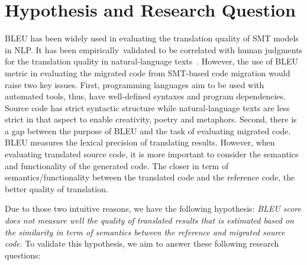 \section{Hypothesis and Research Question}

BLEU has been widely used in evaluating the translation quality of SMT
models in NLP. It has been empirically~validated to be correlated with
human judgments for the translation quality in natural-language
texts~\cite{Papineni2002}.
%
%
However, the use of BLEU metric in evaluating the migrated code from
SMT-based code migration would raise two key issues. First,
programming languages aim to be used with automated tools, thus, have
well-defined syntaxes and program dependencies. Source code has strict syntactic
structure while natural-language texts are less strict in that aspect
to enable creativity, poetry and metaphors.
%
%
Second, there is a gap between the purpose of BLEU and the task of
evaluating migrated code. BLEU measures the lexical precision of
translating results. However, when evaluating translated source code,
it is more important to consider the semantics and functionality of
the generated code.
%
The closer in term of semantics/functionality between the translated
code and the reference code, the better quality of
translation.
%

Due to those two intuitive reasons, we have the following hypothesis:
{\em BLEU score does not measure well the quality of translated results
that is estimated based on the similarity in term of
semantics between the reference and migrated source code}. To validate
this hypothesis, we aim to answer these following research questions:
%

